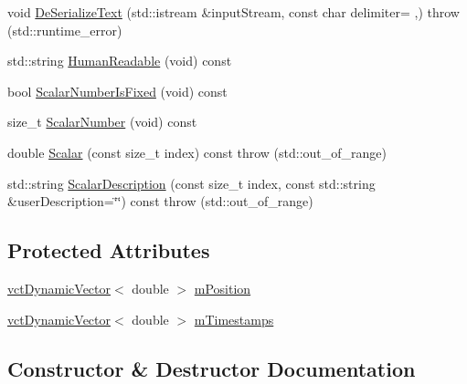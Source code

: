 \begin{DoxyCompactItemize}
void \hyperlink{classprm_position_joint_get_a89976a5f76c463bafafe61273fe1f9c5}{De\+Serialize\+Text} (std\+::istream \&input\+Stream, const char delimiter= \textquotesingle{},\textquotesingle{})  throw (std\+::runtime\+\_\+error)
\item 
std\+::string \hyperlink{classprm_position_joint_get_a370d5310b2185390226577b59ef6800b}{Human\+Readable} (void) const 
\item 
bool \hyperlink{classprm_position_joint_get_a04f68a2a3a9becd6264936929a7dea42}{Scalar\+Number\+Is\+Fixed} (void) const 
\item 
size\+\_\+t \hyperlink{classprm_position_joint_get_acfa7787de95b0bc75f14235491774711}{Scalar\+Number} (void) const 
\item 
double \hyperlink{classprm_position_joint_get_ad32c5d676d6e46fb5e2ad287ba9f2332}{Scalar} (const size\+\_\+t index) const   throw (std\+::out\+\_\+of\+\_\+range)
\item 
std\+::string \hyperlink{classprm_position_joint_get_a84bf96f535df72eeb8481cbd9bacc55e}{Scalar\+Description} (const size\+\_\+t index, const std\+::string \&user\+Description=\char`\"{}\char`\"{}) const   throw (std\+::out\+\_\+of\+\_\+range)
\end{DoxyCompactItemize}
\subsection*{Protected Attributes}
\begin{DoxyCompactItemize}
\item 
\hyperlink{classvct_dynamic_vector}{vct\+Dynamic\+Vector}$<$ double $>$ \hyperlink{classprm_position_joint_get_a9a7bd809fc2805e1902de89a108331ca}{m\+Position}
\item 
\hyperlink{classvct_dynamic_vector}{vct\+Dynamic\+Vector}$<$ double $>$ \hyperlink{classprm_position_joint_get_a1a391f7e9a645609367916dc2ae7683c}{m\+Timestamps}
\end{DoxyCompactItemize}


\subsection{Constructor \& Destructor Documentation}
\hypertarget{classprm_position_joint_get_a69350009ebaba3339c0ec32b3aae6b7f}{}
